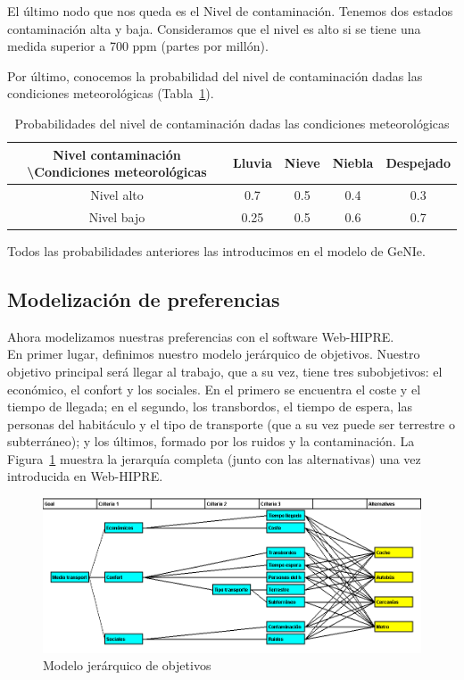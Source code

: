 \documentclass[12pt,a4paper,twoside,openright,titlepage,final]{article}
\begin{document}
El último nodo que nos queda es el Nivel de contaminación. Tenemos dos estados contaminación alta y baja. Consideramos que el nivel es alto si se tiene una medida superior a 700 ppm (partes por millón).

Por último, conocemos la probabilidad del nivel de contaminación dadas las condiciones meteorológicas (Tabla~\ref{tbl:condicionadas_3}).\\

\begin{table}[htbp!]
	\centering
	\caption{Probabilidades del nivel de contaminación dadas las condiciones meteorológicas}
	\label{tbl:condicionadas_3}
	\begin{tabular}{@{}ccccc@{}}
		\toprule
		Nivel contaminación \textbackslash Condiciones meteorológicas & Lluvia & Nieve & Niebla & Despejado \\ \midrule
		Nivel alto                                                    & 0.7    & 0.5   & 0.4    & 0.3       \\
		Nivel bajo                                                    & 0.25   & 0.5   & 0.6    & 0.7       \\ \bottomrule
	\end{tabular}
\end{table}

Todos las probabilidades anteriores las introducimos en el modelo de GeNIe.

\subsection{Modelización de preferencias}

Ahora modelizamos nuestras preferencias con el software Web-HIPRE.\\

En primer lugar, definimos nuestro modelo jerárquico de objetivos. Nuestro objetivo principal será llegar al trabajo, que a su vez, tiene tres subobjetivos: el económico, el confort y los sociales. En el primero se encuentra el coste y el tiempo de llegada; en el segundo, los transbordos, el tiempo de espera, las personas del habitáculo y el tipo de transporte (que a su vez puede ser terrestre o subterráneo); y los últimos, formado por los ruidos y la contaminación. La Figura~\ref{fig:modelo_jerarquico_objetivos} muestra la jerarquía completa (junto con las alternativas) una vez introducida en Web-HIPRE.

\begin{figure}[tbph!]
	\centering
	\includegraphics[width=0.9\linewidth]{imagenes/modelo_jerarquico_objetivos}
	\caption{Modelo jerárquico de objetivos}
	\label{fig:modelo_jerarquico_objetivos}
\end{figure}
\end{document}

